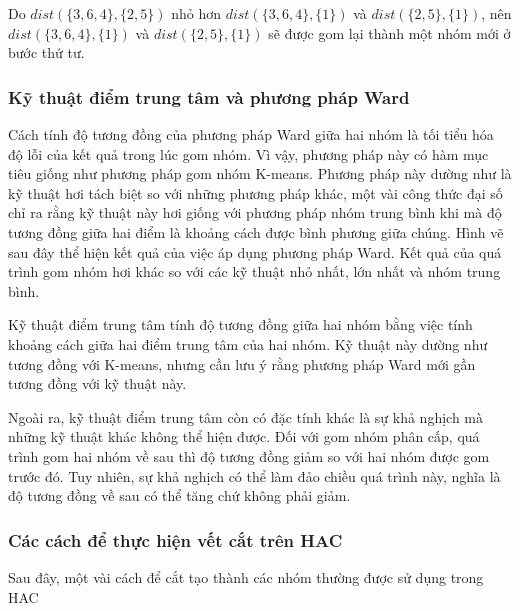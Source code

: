 Do $dist(\{3, 6, 4\}, \{2, 5\})$ nhỏ hơn $dist(\{3, 6, 4\}, \{1\})$ và $dist(\{2, 5\}, \{1\})$, nên $dist(\{3, 6, 4\}, \{1\})$ và $dist(\{2, 5\}, \{1\})$ sẽ được gom lại thành một nhóm mới ở bước thứ tư.

\subsubsection{Kỹ thuật điểm trung tâm và phương pháp Ward}
Cách tính độ tương đồng của phương pháp Ward giữa hai nhóm là tối tiểu hóa độ lỗi của kết quả trong lúc gom nhóm.
Vì vậy, phương pháp này có hàm mục tiêu giống như phương pháp gom nhóm K-means.
Phương pháp này dường như là kỹ thuật hơi tách biệt so với những phương pháp khác, một vài công thức đại số chỉ ra rằng kỹ thuật này hơi giống với phương pháp nhóm trung bình khi mà độ tương đồng giữa hai điểm là khoảng cách được bình phương giữa chúng.
Hình vẽ sau đây thể hiện kết quả của việc áp dụng phương pháp Ward. Kết quả của quá trình gom nhóm hơi khác so với các kỹ thuật nhỏ nhất, lớn nhất và nhóm trung bình.

Kỹ thuật điểm trung tâm tính độ tương đồng giữa hai nhóm bằng việc tính khoảng cách giữa hai điểm trung tâm của hai nhóm.
Kỹ thuật này dường như tương đồng với K-means, nhưng cần lưu ý rằng phương pháp Ward mới gần tương đồng với kỹ thuật này.

Ngoài ra, kỹ thuật điểm trung tâm còn có đặc tính khác là sự khả nghịch mà những kỹ thuật khác không thể hiện được.
Đối với gom nhóm phân cấp, quá trình gom hai nhóm về sau thì độ tương đồng giảm so với hai nhóm được gom trước đó.
Tuy nhiên, sự khả nghịch có thể làm đảo chiều quá trình này, nghĩa là độ tương đồng về sau có thể tăng chứ không phải giảm.


\subsubsection{Các cách để thực hiện vết cắt trên HAC}

Sau đây, một vài cách để cắt tạo thành các nhóm thường được sử dụng trong HAC

